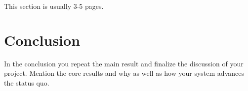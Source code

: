 \documentclass[a4paper,11pt,oneside]{report}
\theoremstyle{definition}
\begin{document}
This section is usually 3-5 pages.


\chapter{Conclusion}

In the conclusion you repeat the main result and finalize the discussion of
your project. Mention the core results and why as well as how your system
advances the status quo.

\cleardoublepage
{}
{}
\printbibliography
\end{document}
